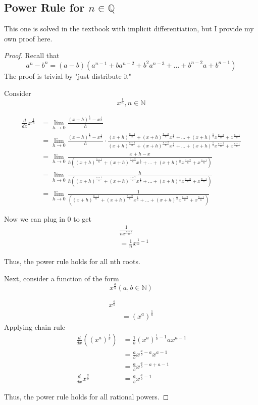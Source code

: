 \subsection{Power Rule for $n \in \mathbb{Q}$}

This one is solved in the textbook with implicit differentiation, but I provide my own proof here.

\begin{proof}
Recall that 
\[a^n - b^n = (a - b)(a^{n-1} + ba^{n-2} + b^2a^{n-3} + \ldots +  b^{n-2}a + b^{n-1})\]
The proof is trivial by "just distribute it"

Consider 
\[x^{\frac{1}{n}}, n \in \mathbb{N}\]

\begin{align}
\frac{d}{dx} x ^{\frac{1}{n}} &= \lim_{h \to 0} \frac{(x + h)^{\frac{1}{n}} - x^{\frac{1}{n}}}{h} \\
&= \lim_{h \to 0} \frac{(x + h)^{\frac{1}{n}} - x^{\frac{1}{n}}}{h} \cdot \frac{(x+h)^{\frac{n-1}{n}} + (x+h)^{\frac{n-2}{n}} x^{\frac{1}{n}} + \ldots + (x+h)^{\frac{1}{n}} x ^ {\frac{n - 2}{n}} + x^{\frac{n-1}{n}}}{(x+h)^{\frac{n-1}{n}} + (x+h)^{\frac{n-2}{n}} x^{\frac{1}{n}}  + \ldots + (x+h)^{\frac{1}{n}} x ^ {\frac{n - 2}{n}} + x^{\frac{n-1}{n}}} \\
&=\lim_{h \to 0} \frac{x + h - x}{h((x+h)^{\frac{n-1}{n}} + (x+h)^{\frac{n-2}{n}} x^{\frac{1}{n}}  + \ldots + (x+h)^{\frac{1}{n}} x ^ {\frac{n - 2}{n}} + x^{\frac{n-1}{n}})}\\
&= \lim_{h \to 0}\frac{h}{h((x+h)^{\frac{n-1}{n}} + (x+h)^{\frac{n-2}{n}} x^{\frac{1}{n}}  + \ldots + (x+h)^{\frac{1}{n}} x ^ {\frac{n - 2}{n}} + x^{\frac{n-1}{n}})}\\
&= \lim_{h \to 0}\frac{1}{((x+h)^{\frac{n-1}{n}} + (x+h)^{\frac{n-2}{n}} x^{\frac{1}{n}}  + \ldots + (x+h)^{\frac{1}{n}} x ^ {\frac{n - 2}{n}} + x^{\frac{n-1}{n}})}
\end{align}

Now we can plug in 0 to get 
\begin{align}
&\frac{1}{nx^{\frac{n-1}{n}}}\\
&= \frac{1}{n} x^{\frac{1}{n} - 1}
\end{align}

Thus, the power rule holds for all nth roots.

Next, consider a function of the form 
\[x^{\frac{a}{b}} (a, b \in \mathbb{N})\]

\begin{align}
x^{\frac{a}{b}} \\ 
&= (x^a)^{\frac{1}{b}}
\end{align}
Applying chain rule
\begin{align}
\frac{d}{dx}((x^a)^{\frac{1}{b}}) &= \frac{1}{b}(x^a)^{\frac{1}{b} - 1} a x^{a-1} \\
&= \frac{a}{b} x^{\frac{a}{b} - a} x^{a - 1} \\
&= \frac{a}{b} x^{\frac{a}{b} -a  + a - 1}\\
\frac{d}{dx} x^{\frac{a}{b}}&= \frac{a}{b} x^{\frac{a}{b} - 1}
\end{align}

Thus, the power rule holds for all rational powers.
\end{proof}

